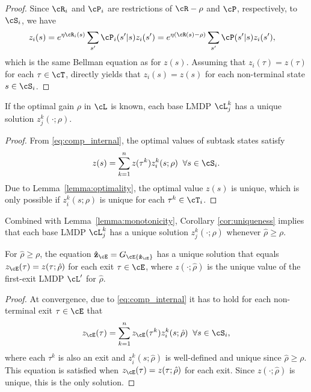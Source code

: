 \begin{proof} Since $\cR_i$ and $\cP_i$ are restrictions of $\cR-\rho$ and $\cP$, respectively, to $\cS_i$, we have
\begin{align*}
    z_i(s) &= e^{\eta\cR_i(s)}\sum_{s'}\cP_i(s'\lvert s) z_i(s') = e^{\eta(\cR(s) - \rho)}\sum_{s'}\cP(s'\lvert s) z_i(s'), \nonumber
\end{align*}
which is the same Bellman equation as for $z(s)$. Assuming that $z_i(\tau) = z(\tau)$ for each $\tau\in\cT$, directly yields that $z_i(s)=z(s)$ for each non-terminal state $s\in\cS_i$.
\end{proof}

\begin{corollary}\label{cor:uniqueness}
    If the optimal gain $\rho$ in $\cL$ is known, each base LMDP $\cL_j^k$ has a unique solution $z_j^k(\cdot;\rho)$.
\end{corollary}

\begin{proof} From \eqref{eq:comp_internal}, the optimal values of subtask states satisfy
\[
  z(s) = \sum_{k=1}^n z(\tau^k) z_i^k(s;\rho)\;\;\forall s\in\cS_i.
\]
Due to Lemma~\ref{lemma:optimality}, the optimal value $z(s)$ is unique, which is only possible if $z_i^k(s;\rho)$ is unique for each $\tau^k\in\cT_i$.
\end{proof}

Combined with Lemma~\ref{lemma:monotonicity}, Corollary \ref{cor:uniqueness} implies that each base LMDP $\cL_j^k$ has a unique solution $z_j^k(\cdot;\hat\rho)$ whenever $\hat\rho\geq\rho$.

\begin{lemma}
For $\hat\rho\geq\rho$, the equation ${\bf \hat z_\cE} = G_\cE {\bf\hat z_\cE}$ has a unique solution that equals $z_\cE(\tau)=z(\tau;\hat\rho)$ for each exit $\tau\in\cE$, where $z(\cdot;\hat\rho)$ is the unique value of the first-exit LMDP $\cL'$ for $\hat\rho$.
\end{lemma}

\begin{proof}
At convergence, due to \eqref{eq:comp_internal} it has to hold for each non-terminal exit $\tau\in\cE$ that
\[
  z_\cE(\tau) = \sum_{k=1}^n z_\cE(\tau^k) z_i^k(s;\hat\rho)\;\;\forall s\in\cS_i,
\]
where each $\tau^k$ is also an exit and $z_i^k(s;\hat\rho)$ is well-defined and unique since $\hat\rho\geq\rho$. This equation is satisfied when $z_\cE(\tau)=z(\tau;\hat\rho)$ for each exit. Since $z(\cdot;\hat\rho)$ is unique, this is the only solution.
\end{proof}

